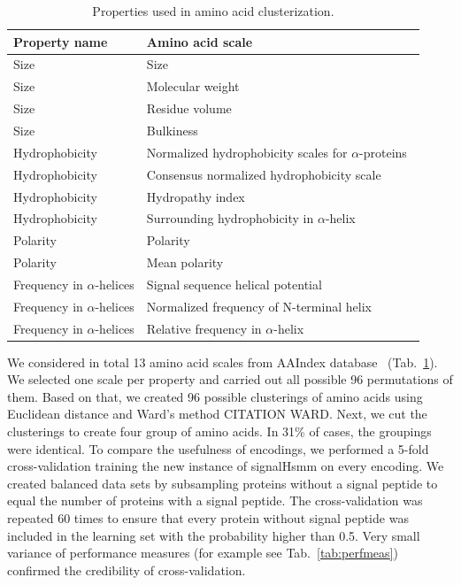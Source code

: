 \documentclass[10pt,letterpaper]{article}
\begin{document}
\begin{table}[ht]
\centering
\caption{Properties used in amino acid clusterization.} 
\begin{tabular}{ll}
  \toprule
Property name & Amino acid scale \\ 
  \midrule
Size & Size~\cite{dawson1972size} \\ 
   \rowcolor[gray]{0.85}Size & Molecular weight~\cite{fasman1976handbook}\\ 
  Size & Residue volume~\cite{1973goldsackcontribution} \\ 
   \rowcolor[gray]{0.85}Size & Bulkiness~\cite{1968zimmermanthe} \\ 
  Hydrophobicity & Normalized hydrophobicity scales for $\alpha$-proteins~\cite{1992cidhydrophobicity} \\ 
   \rowcolor[gray]{0.85}Hydrophobicity & Consensus normalized hydrophobicity scale~\cite{1984eisenbergthreedimensional} \\ 
  Hydrophobicity & Hydropathy index~\cite{1982kytea} \\ 
   \rowcolor[gray]{0.85}Hydrophobicity & Surrounding hydrophobicity in $\alpha$-helix~\cite{1980ponnuswamyhydrophobic} \\ 
  Polarity & Polarity~\cite{1974granthamamino} \\ 
   \rowcolor[gray]{0.85}Polarity & Mean polarity~\cite{1988radzickainfluences} \\ 
  Frequency in $\alpha$-helices & Signal sequence helical potential~\cite{1982argosstructural} \\ 
   \rowcolor[gray]{0.85}Frequency in $\alpha$-helices & Normalized frequency of N-terminal helix~\cite{chou1978prediction} \\ 
  Frequency in $\alpha$-helices & Relative frequency in $\alpha$-helix~\cite{1990prabhakaranthe} \\ 
   \bottomrule
\end{tabular}
\label{tab:aaprop}
\end{table}

We considered in total 13 amino acid scales from AAIndex database~\cite{2008kawashimaaaindex} (Tab.~\ref{tab:aaprop}). We selected one scale per property and carried out all possible 96 permutations of them. Based on that, we created 96 possible clusterings of amino acids using Euclidean distance and Ward's method CITATION WARD. Next, we cut the clusterings to create four group of amino acids. In 31\% of cases, the groupings were identical. To compare the usefulness of encodings, we performed a 5-fold cross-validation training the new instance of signalHsmm on every encoding. We created balanced data sets by subsampling proteins without a signal peptide to equal the number of proteins with a signal peptide. The cross-validation was repeated 60 times to ensure that every protein without signal peptide was included in the learning set with the probability higher than 0.5. Very small variance of performance measures (for example see Tab.~\ref{tab:perfmeas}) confirmed the credibility of cross-validation.
\end{document}
